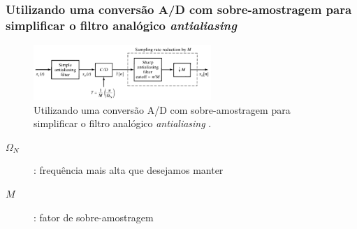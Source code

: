\begin{frame}[allowframebreaks]
  \frametitle{Utilizando uma conversão A/D com sobre-amostragem para simplificar o filtro analógico \textit{antialiasing}}

  \begin{figure}[h!]
  \centering
  \includegraphics[width=0.6\textwidth]{images/oppenheim_fig443.png}
  \caption{Utilizando uma conversão A/D com sobre-amostragem para simplificar o filtro analógico \textit{antialiasing} \citep{oppenheim2009}.}
  \label{fig:oppenheim_fig443}
  \end{figure}

  \begin{description}
  \item[$\Omega_N$]: frequência mais alta que desejamos manter
  \item[$M$]: fator de sobre-amostragem
  \end{description}

\end{frame}


